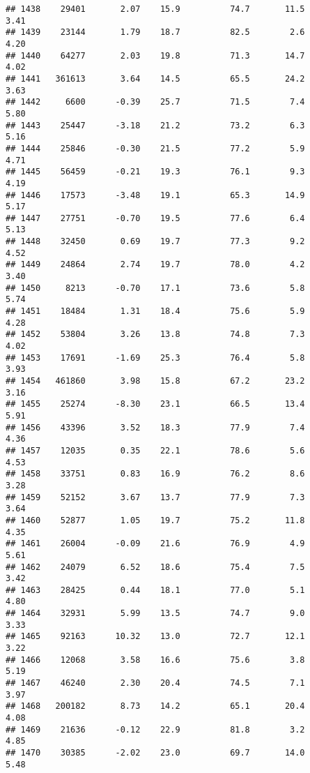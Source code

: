 \documentclass[
]{article}
\begin{document}
\begin{verbatim}
## 1438    29401       2.07    15.9          74.7       11.5              3.41
## 1439    23144       1.79    18.7          82.5        2.6              4.20
## 1440    64277       2.03    19.8          71.3       14.7              4.02
## 1441   361613       3.64    14.5          65.5       24.2              3.63
## 1442     6600      -0.39    25.7          71.5        7.4              5.80
## 1443    25447      -3.18    21.2          73.2        6.3              5.16
## 1444    25846      -0.30    21.5          77.2        5.9              4.71
## 1445    56459      -0.21    19.3          76.1        9.3              4.19
## 1446    17573      -3.48    19.1          65.3       14.9              5.17
## 1447    27751      -0.70    19.5          77.6        6.4              5.13
## 1448    32450       0.69    19.7          77.3        9.2              4.52
## 1449    24864       2.74    19.7          78.0        4.2              3.40
## 1450     8213      -0.70    17.1          73.6        5.8              5.74
## 1451    18484       1.31    18.4          75.6        5.9              4.28
## 1452    53804       3.26    13.8          74.8        7.3              4.02
## 1453    17691      -1.69    25.3          76.4        5.8              3.93
## 1454   461860       3.98    15.8          67.2       23.2              3.16
## 1455    25274      -8.30    23.1          66.5       13.4              5.91
## 1456    43396       3.52    18.3          77.9        7.4              4.36
## 1457    12035       0.35    22.1          78.6        5.6              4.53
## 1458    33751       0.83    16.9          76.2        8.6              3.28
## 1459    52152       3.67    13.7          77.9        7.3              3.64
## 1460    52877       1.05    19.7          75.2       11.8              4.35
## 1461    26004      -0.09    21.6          76.9        4.9              5.61
## 1462    24079       6.52    18.6          75.4        7.5              3.42
## 1463    28425       0.44    18.1          77.0        5.1              4.80
## 1464    32931       5.99    13.5          74.7        9.0              3.33
## 1465    92163      10.32    13.0          72.7       12.1              3.22
## 1466    12068       3.58    16.6          75.6        3.8              5.19
## 1467    46240       2.30    20.4          74.5        7.1              3.97
## 1468   200182       8.73    14.2          65.1       20.4              4.08
## 1469    21636      -0.12    22.9          81.8        3.2              4.85
## 1470    30385      -2.02    23.0          69.7       14.0              5.48

\end{verbatim}
\end{document}
